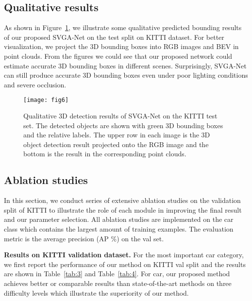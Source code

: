 \documentclass{article}
\begin{document}
\subsection{Qualitative results}
As shown in Figure~\ref{fig:6}, we illustrate some qualitative predicted bounding results of our proposed SVGA-Net on the test split on KITTI dataset. For better visualization, we project the 3D bounding boxes into RGB images and BEV in point clouds. From the figures we could see that our proposed network could estimate accurate 3D bounding boxes in different scenes. Surprisingly, SVGA-Net can still produce accurate 3D bounding boxes even under poor lighting conditions and severe occlusion.

\begin{figure}[htbp]
\centering
  \texttt{[image: fig6]}
  \caption{Qualitative 3D detection results of SVGA-Net on the KITTI test set. The detected objects are shown with green 3D bounding boxes and the relative labels. The upper row in each image is the 3D object detection result projected onto the RGB image and the bottom is the result in the corresponding point clouds.}
  \label{fig:6}
\end{figure}
\subsection{Ablation studies}
In this section, we conduct series of extensive ablation studies on the validation split of KITTI to illustrate the role of each module in improving the final result and our parameter selection. All ablation studies are implemented on the car class which contains the largest amount of training examples. The evaluation metric is the average precision (AP \%) on the val set.

\textbf{Results on KITTI validation dataset.} For the most important car category, we first report the performance of our method on KITTI val split and the results are shown in Table~\ref{tab:3} and Table~\ref{tab:4}. For car, our proposed method achieves better or comparable results than state-of-the-art methods on three difficulty levels which illustrate the superiority of our method.
\end{document}
